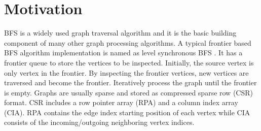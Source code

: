 \section{Motivation} \label{sec:motivation}


BFS is a widely used graph traversal algorithm and it is the basic 
building component of many other graph processing algorithms. 
A typical frontier based BFS algorithm implementation is named as 
level synchronous BFS \cite{attia2014cygraph, betkaoui2012reconfigurable, 
zhang2017boosting}. It has a frontier queue to store the vertices to 
be inspected. Initially, the source vertex is only vertex in the frontier.
By inspecting the frontier vertices, new vertices are traversed and become 
the frontier. Iteratively process the graph until the frontier is empty.
Graphs are usually sparse and stored as compressed sparse row (CSR) format. 
CSR includes a row pointer array (RPA) and a column index array (CIA).
RPA contains the edge index starting position of each vertex 
while CIA consists of the incoming/outgoing neighboring vertex indices.


